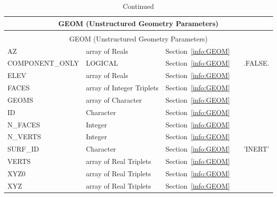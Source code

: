 \documentclass[12pt]{article}
\begin{document}
\begin{longtable}{@{\extracolsep{\fill}}|l|l|l|l|l|}
\caption[Unstructured geometry parameters ({\ct GEOM} namelist group)]{For more information see Section~\ref{info:GEOM}.}
\label{tbl:GEOM} \\
\hline
\multicolumn{5}{|c|}{{\ct GEOM} (Unstructured Geometry Parameters)} \\
\hline \hline
\endfirsthead
\caption[]{Continued} \\
\hline
\multicolumn{5}{|c|}{{\ct GEOM} (Unstructured Geometry Parameters)} \\
\hline \hline
\endhead
{\ct AZ}           & array of Reals                & Section~\ref{info:GEOM}            &           &                          \\ \hline
{\ct COMPONENT\_ONLY}     & LOGICAL                & Section~\ref{info:GEOM}            &           &  {\ct .FALSE.}           \\ \hline
{\ct ELEV}         & array of Reals                & Section~\ref{info:GEOM}            &           &                          \\ \hline
{\ct FACES}        & array of Integer Triplets     & Section~\ref{info:GEOM}            &           &                          \\ \hline
{\ct GEOMS}        & array of Character            & Section~\ref{info:GEOM}            &           &                          \\ \hline
{\ct ID}           & Character                     & Section~\ref{info:GEOM}            &           &                          \\ \hline
{\ct N\_FACES}     & Integer                       & Section~\ref{info:GEOM}            &           &                          \\ \hline
{\ct N\_VERTS}     & Integer                       & Section~\ref{info:GEOM}            &           &                          \\ \hline
{\ct SURF\_ID}     & Character                     & Section~\ref{info:GEOM}            &           &  {\ct 'INERT'}           \\ \hline
{\ct VERTS}        & array of Real Triplets        & Section~\ref{info:GEOM}            &           &                          \\ \hline
{\ct XYZ0}         & array of Real Triplets        & Section~\ref{info:GEOM}            &           &                          \\ \hline
{\ct XYZ}          & array of Real Triplets        & Section~\ref{info:GEOM}            &           &                          \\ \hline

\end{longtable}


\vspace{\baselineskip}
\end{document}
